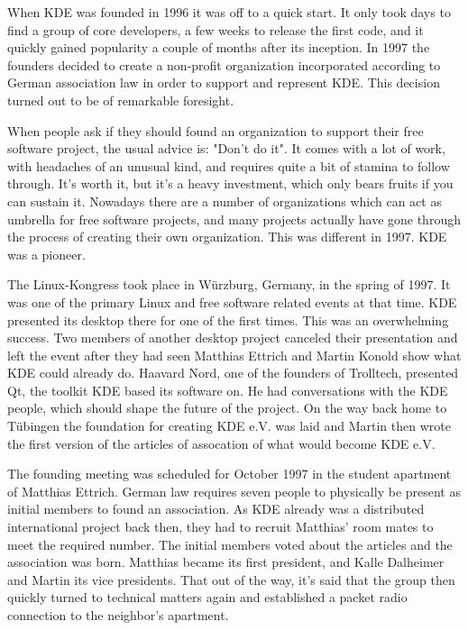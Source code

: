 

\noindent{}When KDE was founded in 1996 it was off to a quick start. It only took days to find a group of core developers, a few weeks to release the first code, and it quickly gained popularity a couple of months after its inception. In 1997 the founders decided to create a non-profit organization incorporated according to German association law in order to support and represent KDE. This decision turned out to be of remarkable foresight.

When people ask if they should found an organization to support their free software project, the usual advice is: "Don't do it". It comes with a lot of work, with headaches of an unusual kind, and requires quite a bit of stamina to follow through. It's worth it, but it's a heavy investment, which only bears fruits if you can sustain it. Nowadays there are a number of organizations which can act as umbrella for free software projects, and many projects actually have gone through the process of creating their own organization. This was different in 1997. KDE was a pioneer.

The Linux-Kongress took place in Würzburg, Germany, in the spring of 1997. It was one of the primary Linux and free software related events at that time. KDE presented its desktop there for one of the first times. This was an overwhelming success. Two members of another desktop project canceled their presentation and left the event after they had seen Matthias Ettrich and Martin Konold show what KDE could already do. Haavard Nord, one of the founders of Trolltech, presented Qt, the toolkit KDE based its software on. He had conversations with the KDE people, which should shape the future of the project. On the way back home to Tübingen the foundation for creating KDE e.V. was laid and Martin then wrote the first version of the articles of assocation of what would become KDE e.V.

The founding meeting was scheduled for October 1997 in the student apartment of Matthias Ettrich. German law requires seven people to physically be present as initial members to found an association. As KDE already was a distributed international project back then, they had to recruit Matthias' room mates to meet the required number. The initial members voted about the articles and the association was born. Matthias became its first president, and Kalle Dalheimer and Martin its vice presidents. That out of the way, it's said that the group then quickly turned to technical matters again and established a packet radio connection to the neighbor's apartment.

